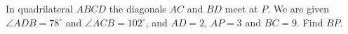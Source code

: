 In quadrilateral $ABCD$ the diagonals $AC$ and $BD$ meet at $P$. We are given $\angle ADB=78^\circ$ and $\angle ACB=102^\circ$, and $AD=2$, $AP=3$ and $BC=9$. Find $BP$.
